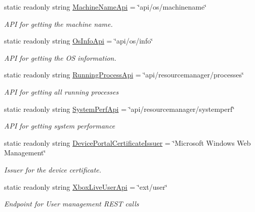 \begin{DoxyCompactItemize}
static readonly string \hyperlink{class_microsoft_1_1_tools_1_1_windows_device_portal_1_1_device_portal_a2ad83b9a2f3e3630b49be04e1880aa63}{Machine\+Name\+Api} = \char`\"{}api/os/machinename\char`\"{}
\begin{DoxyCompactList}\small\item\em A\+PI for getting the machine name. \end{DoxyCompactList}\item 
static readonly string \hyperlink{class_microsoft_1_1_tools_1_1_windows_device_portal_1_1_device_portal_a332f2b67f2e05b5e822124893424b6a4}{Os\+Info\+Api} = \char`\"{}api/os/info\char`\"{}
\begin{DoxyCompactList}\small\item\em A\+PI for getting the OS information. \end{DoxyCompactList}\item 
static readonly string \hyperlink{class_microsoft_1_1_tools_1_1_windows_device_portal_1_1_device_portal_a486b4ac533bb682fc29b72cb3b6c257a}{Running\+Process\+Api} = \char`\"{}api/resourcemanager/processes\char`\"{}
\begin{DoxyCompactList}\small\item\em A\+PI for getting all running processes \end{DoxyCompactList}\item 
static readonly string \hyperlink{class_microsoft_1_1_tools_1_1_windows_device_portal_1_1_device_portal_ac099bf72c4a3dd255e4c78aa74932c63}{System\+Perf\+Api} = \char`\"{}api/resourcemanager/systemperf\char`\"{}
\begin{DoxyCompactList}\small\item\em A\+PI for getting system performance \end{DoxyCompactList}\item 
static readonly string \hyperlink{class_microsoft_1_1_tools_1_1_windows_device_portal_1_1_device_portal_a58775dec23c77183f38d90b2e784a1e9}{Device\+Portal\+Certificate\+Issuer} = \char`\"{}Microsoft Windows Web Management\char`\"{}
\begin{DoxyCompactList}\small\item\em Issuer for the device certificate. \end{DoxyCompactList}\item 
static readonly string \hyperlink{class_microsoft_1_1_tools_1_1_windows_device_portal_1_1_device_portal_ac07403942d72a53432f1a42c9410c929}{Xbox\+Live\+User\+Api} = \char`\"{}ext/user\char`\"{}
\begin{DoxyCompactList}\small\item\em Endpoint for User management R\+E\+ST calls \end{DoxyCompactList}\item 

\end{DoxyCompactItemize}
